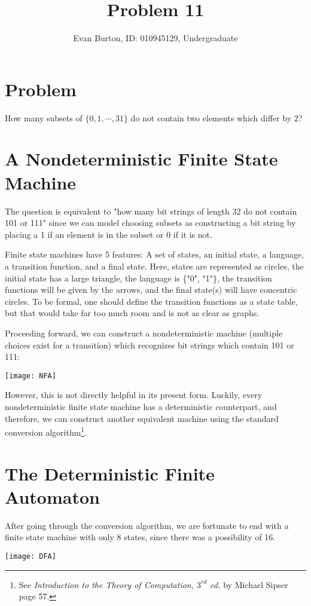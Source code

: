 \documentclass[]{article}
\title{Problem 11}
\author{Evan Burton, ID: 010945129, Undergraduate}
\begin{document}
\maketitle
\section{Problem}
How many subsets of $\{0, 1, \cdots, 31\}$ do not contain two elements which differ by 2?
\section{A Nondeterministic Finite State Machine}
The question is equivalent to "how many bit strings of length 32 do not contain 101 or 111" since we can model choosing subsets as constructing a bit string by placing a 1 if an element is in the subset or 0 if it is not. 

Finite state machines have 5 features: A set of states, an initial state, a language, a transition function, and a final state. Here, states are represented as circles, the initial state has a large triangle, the language is \{"0", "1"\}, the transition functions will be given by the arrows, and the final state(s) will have concentric circles. To be formal, one should define the transition functions as a state table, but that would take far too much room and is not as clear as graphs.

Proceeding forward, we can construct a nondeterministic machine (multiple choices exist for a transition) which recognizes bit strings which contain 101 or 111:

\texttt{[image: NFA]}

However, this is not directly helpful in its present form. Luckily, every nondeterministic finite state machine has a deterministic counterpart, and therefore, we can construct another equivalent machine using the standard conversion algorithm\footnote{See \textit{Introduction to the Theory of Computation, $3^{rd}$ ed.} by Michael Sipser page 57.}.

\section{The Deterministic Finite Automaton}
After going through the conversion algorithm, we are fortunate to end with a finite state machine with only 8 states, since there was a possibility of 16.

\begin{center}
\texttt{[image: DFA]}
\end{center}
\end{document}
